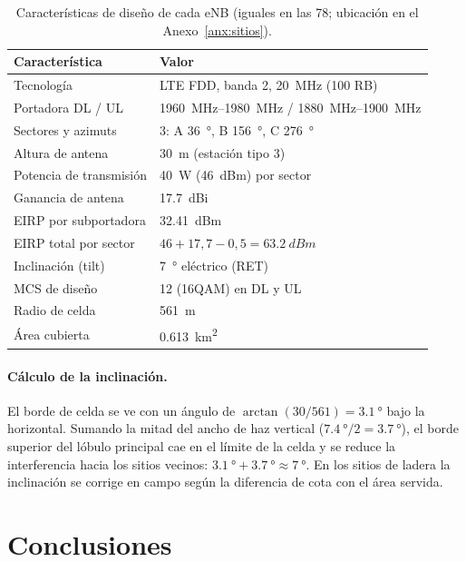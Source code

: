 \documentclass[11pt,letterpaper]{article}
\begin{document}
\begin{table}[H]
\centering
\caption{Características de diseño de cada eNB (iguales en las 78; ubicación en el Anexo~\ref{anx:sitios}).}
\label{tab:caract}
\begin{tabular}{@{}ll@{}}
\toprule
\textbf{Característica} & \textbf{Valor} \\
\midrule
Tecnología & LTE FDD, banda 2, \SI{20}{MHz} (100 RB) \\
Portadora DL / UL & \SIrange{1960}{1980}{MHz} / \SIrange{1880}{1900}{MHz} \\
Sectores y azimuts & 3: A \SI{36}{\degree}, B \SI{156}{\degree}, C \SI{276}{\degree} \\
Altura de antena & \SI{30}{m} (estación tipo 3) \\
Potencia de transmisión & \SI{40}{W} (\SI{46}{dBm}) por sector \\
Ganancia de antena & \SI{17.7}{dBi} \\
EIRP por subportadora & \SI{32.41}{dBm} \\
EIRP total por sector & $46+17{,}7-0{,}5=\SI{63.2}{dBm}$ \\
Inclinación (tilt) & \SI{7}{\degree} eléctrico (RET) \\
MCS de diseño & 12 (16QAM) en DL y UL \\
Radio de celda & \SI{561}{m} \\
Área cubierta & \SI{0.613}{km^2} \\
\bottomrule
\end{tabular}
\end{table}

\paragraph{Cálculo de la inclinación.} El borde de celda se ve con un ángulo de $\arctan(30/561)=\SI{3.1}{\degree}$ bajo la horizontal. Sumando la mitad del ancho de haz vertical ($\SI{7.4}{\degree}/2=\SI{3.7}{\degree}$), el borde superior del lóbulo principal cae en el límite de la celda y se reduce la interferencia hacia los sitios vecinos: $\SI{3.1}{\degree}+\SI{3.7}{\degree}\approx\SI{7}{\degree}$. En los sitios de ladera la inclinación se corrige en campo según la diferencia de cota con el área servida.

\section{Conclusiones}
\end{document}
